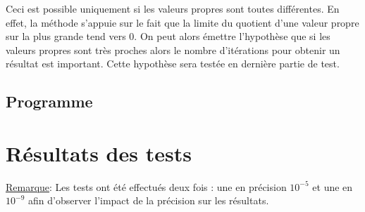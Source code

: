 \documentclass{report}
\begin{document}
      Ceci est possible uniquement si les valeurs propres sont toutes différentes. En effet, la méthode s'appuie sur le fait que la limite du quotient d'une valeur propre sur la plus grande tend vers 0. On peut alors émettre l'hypothèse que si les valeurs propres sont très proches alors le nombre d'itérations pour obtenir un résultat est important. Cette hypothèse sera testée en dernière partie de test.
      
      \subsection{Programme}
	
    \section{Résultats des tests}
      \underline{Remarque}: Les tests ont été effectués deux fois : une en précision $10^{-5}$ et une en $10^{-9}$ afin d'observer l'impact de la précision sur les résultats.
\end{document}
